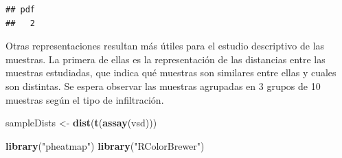 \documentclass[
]{article}
\newenvironment{Shaded}{\begin{snugshade}}{\end{snugshade}}
\newcommand{\DataTypeTok}[1]{\textcolor[rgb]{0.13,0.29,0.53}{#1}}
\newcommand{\DecValTok}[1]{\textcolor[rgb]{0.00,0.00,0.81}{#1}}
\newcommand{\KeywordTok}[1]{\textcolor[rgb]{0.13,0.29,0.53}{\textbf{#1}}}
\newcommand{\NormalTok}[1]{#1}
\newcommand{\OperatorTok}[1]{\textcolor[rgb]{0.81,0.36,0.00}{\textbf{#1}}}
\newcommand{\OtherTok}[1]{\textcolor[rgb]{0.56,0.35,0.01}{#1}}
\newcommand{\StringTok}[1]{\textcolor[rgb]{0.31,0.60,0.02}{#1}}
\begin{document}
\begin{verbatim}
## pdf 
##   2
\end{verbatim}

Otras representaciones resultan más útiles para el estudio descriptivo
de las muestras. La primera de ellas es la representación de las
distancias entre las muestras estudiadas, que indica qué muestras son
similares entre ellas y cuales son distintas. Se espera observar las
muestras agrupadas en 3 grupos de 10 muestras según el tipo de
infiltración.

\begin{Shaded}
\begin{Highlighting}[]
\NormalTok{sampleDists <-}\StringTok{ }\KeywordTok{dist}\NormalTok{(}\KeywordTok{t}\NormalTok{(}\KeywordTok{assay}\NormalTok{(vsd)))}
\end{Highlighting}
\end{Shaded}

\begin{Shaded}
\begin{Highlighting}[]
\KeywordTok{library}\NormalTok{(}\StringTok{"pheatmap"}\NormalTok{)}
\KeywordTok{library}\NormalTok{(}\StringTok{"RColorBrewer"}\NormalTok{)}
\end{Highlighting}
\end{Shaded}

\begin{Shaded}
\end{Shaded}
\end{document}
